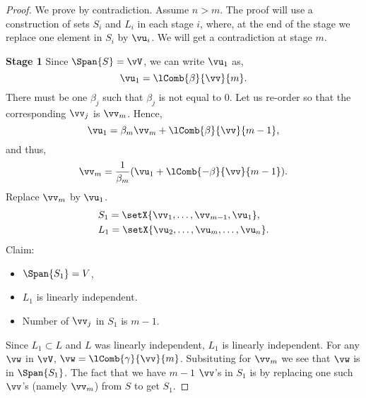 \begin{proof}
    We prove by contradiction. Assume $n > m$. The proof will use a construction of sets $S_{i}$ and $L_{i}$
    in each stage $i$,
    where, at the end of the stage we replace one element in $S_i$ by $\vu_i$. We will get a contradiction at
    stage $m$.

    \textbf{Stage 1}
    Since $\Span{S} = \vV$, we can write $\vu_{1}$ as,
    \[\vu_{1} = \lComb{\beta}{\vv}{m}.\]
    There must be one $\beta_j$ such that $\beta_j$ is not equal to $0$. Let us re-order so that the
    corresponding $\vv_{j}$ is $\vv_{m}$. Hence,
    \[\vu_{1} = \beta_{m}\vv_{m} + \lComb{\beta}{\vv}{m-1},\]
    and thus,
    \[\vv_m = \frac{1}{\beta_{m}}(\vu_{1} + \lComb{-\beta}{\vv}{m-1}).\]
    Replace $\vv_m$ by $\vu_1$.
    \begin{align*}
	&S_1 = \setX{\vv_{1},\ldots,\vv_{m-1},\vu_1},\\
	&L_1 = \setX{\vu_{2},\ldots,\vu_{m},\ldots,\vu_{n}}.
    \end{align*}
    Claim:
    \begin{itemize}
	\item
	    $\Span{S_1} = V$,
	\item
	    $L_1$ is linearly independent.
	\item
	    Number of $\vv_{j}$ in $S_{1}$ is $m-1$. 
    \end{itemize}
    Since $L_1 \subset L$ and $L$ was linearly independent, $L_1$ is linearly independent.
    For any $\vw$ in $\vV$, $\vw = \lComb{\gamma}{\vv}{m}$.
    Subsituting for $\vv_m$ we see that $\vw$ is in $\Span{S_1}$. The fact that we have $m-1$ $\vv$'s in $S_1$
    is by replacing one such $\vv$'s (namely $\vv_{m}$) from $S$ to get $S_1$.


\end{proof}

